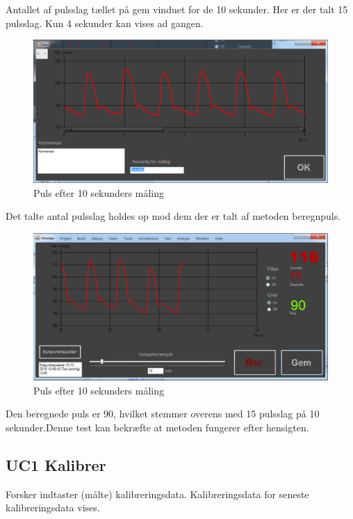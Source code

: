 Antallet af pulsslag tællet på gem vinduet for de 10 sekunder. Her er der talt 15 pulsslag. Kun 4 sekunder kan vises ad gangen.
\begin{figure}[H]
	\centering
	\includegraphics[width=1\textwidth]{Figurer/Pulstest_gemmevindue}
	\caption{Puls efter 10 sekunders måling}
\end{figure}

Det talte antal pulsslag holdes op mod dem der er talt af metoden beregnpuls.

\begin{figure}[H]
	\centering
	\includegraphics[width=1\textwidth]{Figurer/Pulstest_monitor}
	\caption{Puls efter 10 sekunders måling}
\end{figure}


Den beregnede puls er 90, hvilket stemmer overens med 15 pulsslag på 10 sekunder.Denne test kan bekræfte at metoden fungerer efter hensigten.

\subsection{UC1 Kalibrer}

Forsker indtaster (målte) kalibreringsdata. Kalibreringsdata for seneste kalibreringsdata vises.

